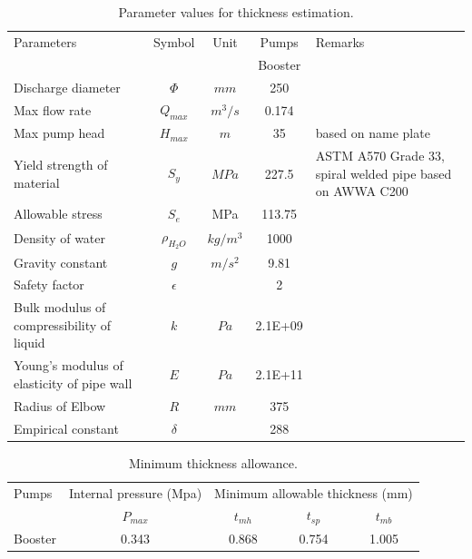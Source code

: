 \begin{table}[h]
	\caption{Parameter values for thickness estimation.}
	\label{ch05_tbl_thicknesscalc}
	{\footnotesize
		\begin{tabular}{p{4cm}|c|c|c|p{4cm}}
			\hline
			Parameters & Symbol & Unit & Pumps & Remarks \\ 
			&  &  & Booster & \\ 
			\hline
			Discharge diameter & $\Phi$ & $mm$ & 250 &  \\ 
			Max flow rate & $Q_{max}$ & $m^3/s$ & 0.174 &  \\ 
			Max pump head & $H_{max}$ & $m$ & 35 & based on name plate \\ 
			Yield strength of material & $S_y$ & $MPa$ & 227.5 & ASTM A570 Grade 33, spiral welded pipe based on AWWA C200 \\ 
			Allowable stress & $S_e$ & MPa & 113.75 &  \\ 
			Density of water & $\rho_{H_2O}$ & $kg/m^3$ & 1000  &  \\ 
			Gravity constant & $g$ & $m/s^2$ & 9.81 &   \\ 
			Safety factor & $\epsilon$ &  & 2 &   \\ 
			Bulk modulus of compressibility of liquid & $k$ & $Pa$ & 2.1E+09 &   \\ 
			Young's modulus of elasticity of pipe wall & $E$ & $Pa$ & 2.1E+11 &  \\ 
			Radius of Elbow & $R$ & $mm$ & 375 &   \\ 
			Empirical constant & $\delta$ &  & 288 &  \\ 
			\hline
		\end{tabular}
	}
\end{table}



\begin{table}[h]
	\caption{Minimum thickness allowance.}	\label{ch05_tbl_thicknesscalcresult}
	{\footnotesize
		\begin{tabular}{l|l|p{3cm}|p{3cm}|p{3cm}}
			\hline
			Pumps & \multicolumn{1}{c|}{Internal pressure  (Mpa)} & \multicolumn{3}{c}{Minimum allowable thickness (mm)} \\ 
			\cline{3-5}
			& \multicolumn{1}{c|}{$P_{max}$} & \multicolumn{1}{c|}{$t_{mh}$} & \multicolumn{1}{c|}{$t_{sp}$} & \multicolumn{1}{c}{$t_{mb}$} \\ 
			\hline
			Booster & \multicolumn{1}{c|}{0.343} & \multicolumn{1}{c|}{0.868} & \multicolumn{1}{c|}{0.754} & \multicolumn{1}{c}{1.005} \\ 
			\hline
		\end{tabular}
		
	}
\end{table}

